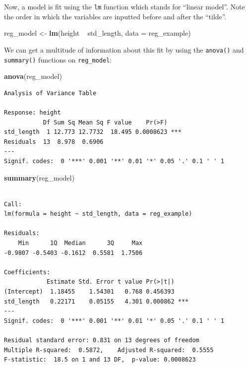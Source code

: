\documentclass[twoside, 12pt]{article}
\newenvironment{Shaded}{\begin{snugshade}}{\end{snugshade}}
\newcommand{\KeywordTok}[1]{\textcolor[rgb]{0.13,0.29,0.53}{\textbf{{#1}}}}
\newcommand{\DataTypeTok}[1]{\textcolor[rgb]{0.13,0.29,0.53}{{#1}}}
\newcommand{\StringTok}[1]{\textcolor[rgb]{0.31,0.60,0.02}{{#1}}}
\newcommand{\NormalTok}[1]{{#1}}
\begin{document}
Now, a model is fit using the \texttt{lm} function which stands for
``linear model''. Note the order in which the variables are inputted
before and after the ``tilde''.

\begin{Shaded}
\begin{Highlighting}[]
\NormalTok{reg_model <-}\StringTok{ }\KeywordTok{lm}\NormalTok{(height ~}\StringTok{ }\NormalTok{std_length, }\DataTypeTok{data =} \NormalTok{reg_example)}
\end{Highlighting}
\end{Shaded}

We can get a multitude of information about this fit by using the
\texttt{anova()} and \texttt{summary()} functions on
\texttt{reg\_model}:

\begin{Shaded}
\begin{Highlighting}[]
\KeywordTok{anova}\NormalTok{(reg_model)}
\end{Highlighting}
\end{Shaded}

\begin{Verbatim}[frame=single]
Analysis of Variance Table

Response: height
           Df Sum Sq Mean Sq F value    Pr(>F)    
std_length  1 12.773 12.7732  18.495 0.0008623 ***
Residuals  13  8.978  0.6906                      
---
Signif. codes:  0 '***' 0.001 '**' 0.01 '*' 0.05 '.' 0.1 ' ' 1
\end{Verbatim}

\begin{Shaded}
\begin{Highlighting}[]
\KeywordTok{summary}\NormalTok{(reg_model)}
\end{Highlighting}
\end{Shaded}

\begin{Verbatim}[frame=single]

Call:
lm(formula = height ~ std_length, data = reg_example)

Residuals:
    Min      1Q  Median      3Q     Max 
-0.9807 -0.5403 -0.1612  0.5581  1.7506 

Coefficients:
            Estimate Std. Error t value Pr(>|t|)    
(Intercept)  1.18455    1.54301   0.768 0.456393    
std_length   0.22171    0.05155   4.301 0.000862 ***
---
Signif. codes:  0 '***' 0.001 '**' 0.01 '*' 0.05 '.' 0.1 ' ' 1

Residual standard error: 0.831 on 13 degrees of freedom
Multiple R-squared:  0.5872,    Adjusted R-squared:  0.5555 
F-statistic:  18.5 on 1 and 13 DF,  p-value: 0.0008623
\end{Verbatim}
\end{document}
